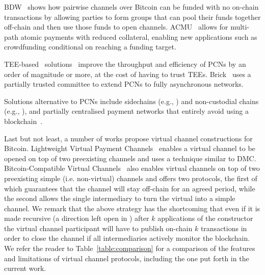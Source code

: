   BDW~\cite{scalable-funding} shows how pairwise channels over Bitcoin can be   funded with no on-chain transactions by allowing parties to form groups that   can pool their funds together off-chain and then use those funds to open   channels. ACMU~\cite{10.1145/3319535.3345666} allows for multi-path atomic   payments with reduced collateral, enabling new applications such as   crowdfunding conditional on reaching a funding target.

  TEE-based~\cite{zhao2019sok}
solutions~\cite{teechan,10.1145/3341301.3359627,liao2021speedster,lee2020routee}
  improve the throughput and efficiency of PCNs by an order of magnitude or
  more, at the cost of having to trust TEEs. Brick~\cite{avarikioti2020brick}
  uses a partially trusted committee to extend PCNs to fully asynchronous
  networks.

  Solutions alternative to PCNs include 
side\-chains (e.g., \cite{BCDF+14,sidechains,KiaZin18}) and
non-custodial chains (e.g.,
\cite{plasma,konstantopoulos2019plasma,plasma-lower-bounds,rollup}),
  and partially centralised payment networks that entirely avoid using a blockchain~\cite{DBLP:conf/trust/ArmknechtKMYZ15,stellar,silentwhispers,DBLP:conf/ndss/RoosMKG18}. 

  Last but not least, a number of works propose virtual channel constructions
  for Bitcoin. Lightweight Virtual Payment
  Channels~\cite{10.1007/978-3-030-65411-5_18} enables a virtual channel to be
  opened on top of two preexisting channels and uses a technique similar to DMC.
  Bitcoin-Compatible Virtual Channels~\cite{cryptoeprint:2020:554} also enables
  virtual channels on top of two preexisting simple (i.e. non-virtual) channels
  and offers two protocols, the first of which guarantees that the channel will
  stay off-chain for an agreed period, while the second allows the single intermediary
  to turn the virtual into a simple channel. 
  We remark that the above strategy has the shortcoming that even if it is made
  recursive (a direction left open in \cite{cryptoeprint:2020:554}) after $k$
  applications of the constructor the virtual channel participant will have to
  publish on-chain $k$ transactions in order to close the channel if all
  intermediaries actively monitor the blockchain.
  We refer the reader to Table~\ref{table:comparison} for a comparison of the
  features and limitations of virtual channel protocols, including the one put
  forth in the current work.

